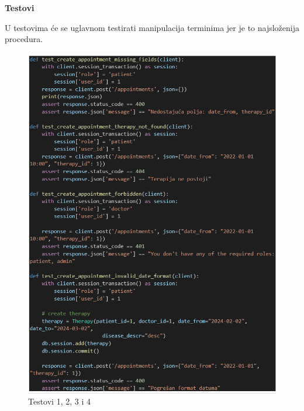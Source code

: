 \textbf{Testovi}


U testovima će se uglavnom testirati manipulacija terminima jer je to najsloženija procedura.

            \begin{figure}[H]
				\includegraphics[scale=0.3]{slike/testovi_1_2_3_4.PNG} %
				\centering
				\caption{Testovi 1, 2, 3 i 4}
				\label{fig:testovi1234}
			\end{figure}
			
